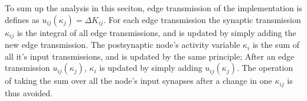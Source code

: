 
			To sum up the analysis in this seciton, edge transmission of the implementation is defines as  $u_{ij}(\kappa_j) = \Delta K_{ij}$.
			For each edge transmission the synaptic transmission $\kappa_{ij}$ is the integral of all edge transmissions, and is updated by simply adding the new edge transmission.
			The postsynaptic node's activity variable $\kappa_i$ is the sum of all it's input transmissions, and is updated by the same principle; %
				After an edge transmission $u_{ij}(\kappa_j)$, $\kappa_i$ is updated by simply adding $u_{ij}(\kappa_j)$. 
			 The operation of taking the sum over all the node's input synapses after a change in one $\kappa_{ij}$ is thus avoided.

			




